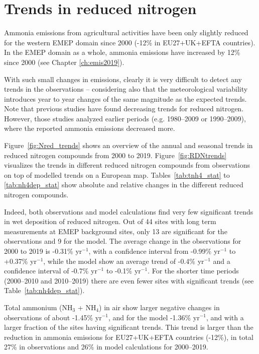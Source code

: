 \clearpage

\section{\label{sec:Trends_reduced nitrogen }Trends in reduced nitrogen}

Ammonia emissions from agricultural activities have been only slightly reduced for the western EMEP domain since 2000 (-12\% in EU27+UK+EFTA countries). In the EMEP domain as a whole, ammonia emissions have increased by 12\% since 2000 (see Chapter \ref{ch:emis2019}).

With such small changes in emissions, clearly it is very difficult to detect any trends in the observations -- considering also that the meteorological variability introduces year to year changes of the same magnitude as the expected trends.
Note that previous studies  \citep[e.g.][]{torseth2012,Theobald2019} have found decreasing trends for reduced nitrogen. However, those studies analyzed earlier periods (e.g. 1980--2009 or 1990--2009), where the reported ammonia emissions decreased more.

Figure~\ref{fig:Nred_trends} shows an overview of the annual and seasonal trends in reduced nitrogen compounds from 2000 to 2019. Figure~\ref{fig:RDNtrends} visualizes the trends in different reduced nitrogen compounds from observations on top of modelled trends on a European map. Tables~\ref{tab:tnh4_stat} to \ref{tab:nh4dep_stat} show absolute and relative changes in the different reduced nitrogen compounds.


Indeed, both observations and model calculations find very few significant trends in wet deposition of reduced nitrogen. Out of 44 sites with long term measurements at EMEP background sites, only 13 are significant for the observations and 9 for the model. The average change in the observations for 2000 to 2019 is -0.31\% yr$^{-1}$, with a confidence interval from -0.99\% yr$^{-1}$ to +0.37\% yr$^{-1}$, while the model show an average trend of -0.4\% yr$^{-1}$ and a confidence interval of -0.7\% yr$^{-1}$ to -0.1\% yr$^{-1}$. For the shorter time periods (2000--2010 and 2010--2019) there are even fewer sites with significant trends (see Table~\ref{tab:nh4dep_stat}).

Total ammonium (NH$_3$ + NH$_4$) in air show larger negative changes in observations of about -1.45\% yr$^{-1}$, and for the model -1.36\% yr$^{-1}$, and with a larger fraction of the sites having significant trends. This trend is larger than the reduction in ammonia emissions for EU27+UK+EFTA countries (-12\%), in total 27\% in observations and 26\% in model calculations for 2000--2019.

